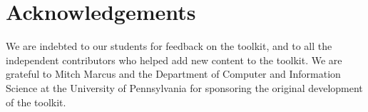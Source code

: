 \documentclass{article}
\begin{document}
\section{Acknowledgements}

We are indebted to our students for feedback on the toolkit, and to
all the independent contributors who helped add new content to the
toolkit.  We are grateful to Mitch Marcus and the Department of
Computer and Information Science at the University of Pennsylvania for
sponsoring the original development of the toolkit.

\nocite{nltk}


\end{document}

